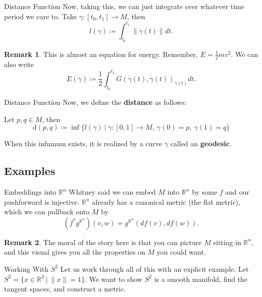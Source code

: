 \documentclass[usenames,dvipsnames]{beamer}
\theoremstyle{definition}
\newtheorem*{remark}{Remark}
\theoremstyle{theorem}
\newcommand{\R}{\mathbb{R}}
\begin{document}
        \begin{frame}{Distance Function}
            Now, taking this, we can just integrate over whatever time period we care to. Take $\gamma \colon [t_0,t_1] \to M$, then
            \[
            l(\gamma)\coloneqq \int_{t_0}^{t_1} \|\dot{\gamma}(t)\|dt.
            \]
            \begin{remark}
            This is almost an equation for energy.  Remember, $E=\frac{1}{2}mv^2$.  We can also write
            \[
            E(\gamma)\coloneqq \frac{1}{2}\int_{t_0}^{t_1}G(\dot{\gamma}(t),\dot{\gamma}(t))_{\gamma(t)}dt.
            \]
            \end{remark}
        \end{frame}
        
        \begin{frame}{Distance Function}
            Now, we define the \textbf{distance} as follows:
            \begin{definition}
                Let $p,q\in M$, then
                \[
                \textrm{d}(p,q)\coloneqq \inf \{l(\gamma)~\vert~\gamma \colon [0,1] \to M, ~\gamma(0)=p,~\gamma(1)=q \}
                \]
            \end{definition}
            \vspace*{0.5cm}
            When this infumum exists, it is realized by a curve $\gamma$ called an \textbf{geodesic}.
        \end{frame}

	
    \subsection{Examples}
    
        \begin{frame}{Embeddings into $\R^n$}
            Whitney said we can embed $M$ into $\R^n$ by some $f$ and our pushforward is injective.  $\R^n$ already has a canonical metric (the flat metric), which we can pullback onto $M$ by
            \[
            (f^* g^{\R^n})(v,w)=g^{\R^n}(df(v),df(w)).
            \]
            \begin{remark}
                The moral of the story here is that you can picture $M$ sitting in $\R^n$, and this visual gives you all the properties on $M$ you could want.
            \end{remark}
        \end{frame}
        
        \begin{frame}{Working With $S^2$}
            Let us work through all of this with an explicit example.
            \vspace*{0.5cm}
            Let $S^2 = \{x \in \R^3 ~\vert~ \|x\|=1\}$. We want to show $S^2$ is a smooth manifold, find the tangent spaces, and construct a metric. 
        \end{frame}
        
\end{document}
